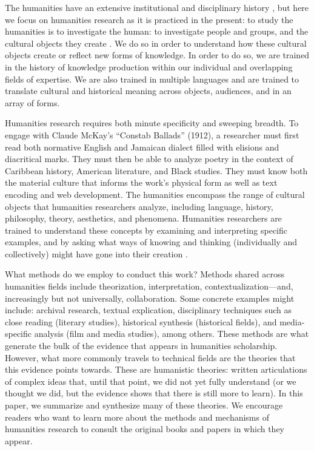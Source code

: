 The humanities have an extensive institutional and disciplinary history \cite{bod_new_2016,noauthor_philology_nodate,reitter_permanent_2021}, but here we focus on humanities research as it is practiced in the present: to study the humanities is to investigate the human: to investigate people and groups, and the cultural objects they create \cite{small_introduction_2013,haufe_humanities_2024}. We do so in order to understand how these cultural objects create or reflect new forms of knowledge. In order to do so, we are trained in the history of knowledge production within our individual and overlapping fields of expertise. We are also trained in multiple languages and are trained to translate cultural and historical meaning across objects, audiences, and in an array of forms. 

Humanities research requires both minute specificity and sweeping breadth. To engage with Claude McKay's ``Constab Ballads'' (1912), a researcher must first read both normative English and Jamaican dialect filled with elisions and diacritical marks. They must then be able to analyze poetry in the context of Caribbean history, American literature, and Black studies. They must know both the material culture that informs the work's physical form as well as text encoding and web development. The humanities encompass the range of cultural objects that humanities researchers analyze, including language, history, philosophy, theory, aesthetics, and phenomena. Humanities researchers are trained to understand these concepts by examining and interpreting specific examples, and by asking what ways of knowing and thinking (individually and collectively) might have gone into their creation \cite{noauthor_claude_nodate}.

What methods do we employ to conduct this work? Methods shared across humanities fields include theorization, interpretation, contextualization---and, increasingly but not universally, collaboration. Some concrete examples might include: archival research, textual explication, disciplinary techniques such as close reading (literary studies), historical synthesis (historical fields), and media-specific analysis (film and media studies), among others. These methods are what generate the bulk of the evidence that appears in humanities scholarship. However, what more commonly travels to technical fields are the theories that this evidence points towards. These are humanistic theories: written articulations of complex ideas that, until that point, we did not yet fully understand (or we thought we did, but the evidence shows that there is still more to learn). In this paper, we summarize and synthesize many of these theories. We encourage readers who want to learn more about the methods and mechanisms of humanities research to consult the original books and papers in which they appear.    

